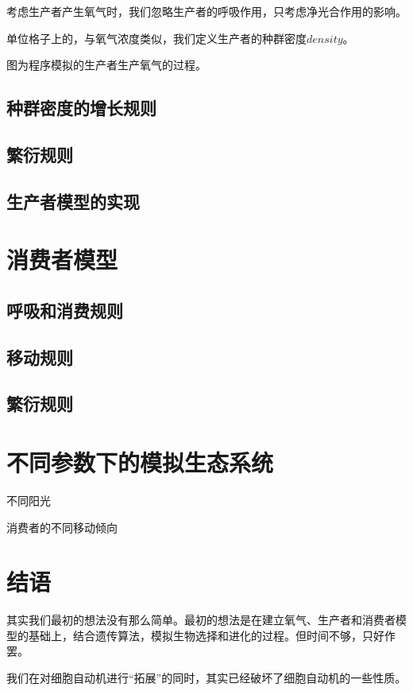 \documentclass{ctexart}
\begin{document}
考虑生产者产生氧气时，我们忽略生产者的呼吸作用，只考虑净光合作用的影响。

单位格子上的，与氧气浓度类似，我们定义生产者的种群密度$density$。

图为程序\underline{}模拟的生产者生产氧气的过程。

\subsection{种群密度的增长规则}

\subsection{繁衍规则}

\subsection{生产者模型的实现}

\section{消费者模型}

\subsection{呼吸和消费规则}

\subsection{移动规则}

\subsection{繁衍规则}

\section{不同参数下的模拟生态系统}

不同阳光

消费者的不同移动倾向

\section{结语}

其实我们最初的想法没有那么简单。最初的想法是在建立氧气、生产者和消费者模型的基础上，结合遗传算法，模拟生物选择和进化的过程。但时间不够，只好作罢。

我们在对细胞自动机进行“拓展”的同时，其实已经破坏了细胞自动机的一些性质。
\end{document}
